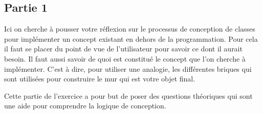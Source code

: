 \subsection{Partie 1}
Ici on cherche à pousser votre réflexion sur le processus de conception de classes pour implémenter un concept existant en dehors de la programmation.
Pour cela il faut se placer du point de vue de l'utilisateur pour savoir ce dont il aurait besoin. 
Il faut aussi savoir de quoi est constitué le concept que l'on cherche à implémenter. C'est à dire, pour utiliser une analogie, les différentes briques qui sont utilisées pour construire le mur qui est votre objet final.

Cette partie de l'exercice a pour but de poser des questions théoriques qui sont une aide pour comprendre la logique de conception.

